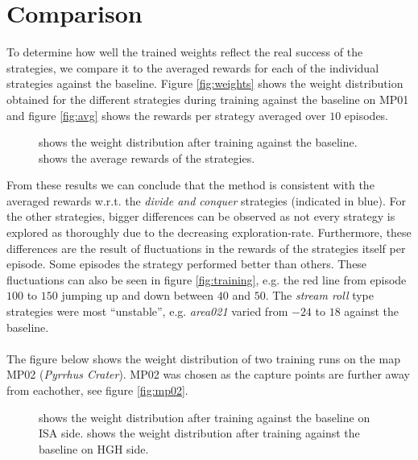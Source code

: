 \section{Comparison}
To determine how well the trained weights reflect the real success of the
strategies, we compare it to the averaged rewards for each of the individual
strategies against the baseline.  Figure \ref{fig:weights} shows the weight
distribution obtained for the different strategies during training against the
baseline on MP01 and figure \ref{fig:avg} shows the rewards per strategy
averaged over $10$ episodes. 
\begin{figure}[ht]
\centering
{}
\label{fig:comparison}
\caption[Comparison]{ shows the weight distribution after
training against the baseline.  shows the average rewards of
the strategies.}
\end{figure}
From these results we can conclude that the method is consistent with the
averaged rewards w.r.t. the \emph{divide and conquer} strategies (indicated in
blue). For the other strategies, bigger differences can be observed as not
every strategy is explored as thoroughly due to the decreasing
exploration-rate. Furthermore, these differences are the result of fluctuations
in the rewards of the strategies itself per episode. Some episodes the strategy
performed better than others.  These fluctuations can also be seen in figure
\ref{fig:training}, e.g. the red line from episode $100$ to $150$ jumping up
and down between $40$ and $50$. The \emph{stream roll} type strategies were
most ``unstable'', e.g. \emph{area021} varied from $-24$ to $18$ against the
baseline.\\\\
The figure below shows the weight distribution of two training runs on the map
MP02 (\emph{Pyrrhus Crater}). MP02 was chosen as the capture points are further
away from eachother, see figure \ref{fig:mp02}. 
\begin{figure}[ht]
\centering
{}
\label{fig:isahgh}
\caption[HGH vs ISA]{ shows the weight distribution after
training against the baseline on ISA side.  shows the weight distribution after
training against the baseline on HGH side.}
\end{figure}
